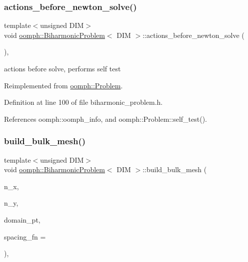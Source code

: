 \subsubsection{\texorpdfstring{actions\+\_\+before\+\_\+newton\+\_\+solve()}{actions\_before\_newton\_solve()}}
{\footnotesize\ttfamily template$<$unsigned D\+IM$>$ \\
void \hyperlink{classoomph_1_1BiharmonicProblem}{oomph\+::\+Biharmonic\+Problem}$<$ D\+IM $>$\+::actions\+\_\+before\+\_\+newton\+\_\+solve (\begin{DoxyParamCaption}{ }\end{DoxyParamCaption})\hspace{0.3cm}{\ttfamily [inline]}, {\ttfamily [virtual]}}



actions before solve, performs self test 



Reimplemented from \hyperlink{classoomph_1_1Problem_a0c8d70891f7369bb4bf8412fa1a08ecb}{oomph\+::\+Problem}.



Definition at line 100 of file biharmonic\+\_\+problem.\+h.



References oomph\+::oomph\+\_\+info, and oomph\+::\+Problem\+::self\+\_\+test().

\mbox{\label{classoomph_1_1BiharmonicProblem_aefd82d374a3a6f899faf752afd39ac36}} 
\subsubsection{\texorpdfstring{build\+\_\+bulk\+\_\+mesh()}{build\_bulk\_mesh()}}
{\footnotesize\ttfamily template$<$unsigned D\+IM$>$ \\
void \hyperlink{classoomph_1_1BiharmonicProblem}{oomph\+::\+Biharmonic\+Problem}$<$ D\+IM $>$\+::build\+\_\+bulk\+\_\+mesh (\begin{DoxyParamCaption}\item[{const unsigned}]{n\+\_\+x,  }\item[{const unsigned}]{n\+\_\+y,  }\item[{\hyperlink{classoomph_1_1TopologicallyRectangularDomain}{Topologically\+Rectangular\+Domain} $\ast$}]{domain\+\_\+pt,  }\item[{\hyperlink{classoomph_1_1HermiteQuadMesh}{Hermite\+Quad\+Mesh}$<$ \hyperlink{classoomph_1_1BiharmonicElement}{Biharmonic\+Element}$<$ 2 $>$ $>$\+::Mesh\+Spacing\+Fn\+Ptr}]{spacing\+\_\+fn = {} }\end{DoxyParamCaption})\hspace{0.3cm}{\ttfamily [inline]}, {\ttfamily [protected]}}



